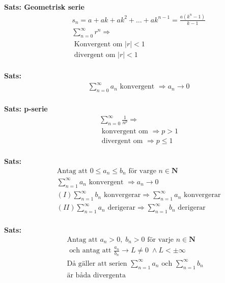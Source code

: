 \begin{multicols}{2}
  \textbf{Sats: Geometrisk serie}
  \begin{align*}
    &\quad  s _ { n } = a + a k + a k ^ { 2 } + \ldots + a k ^ { n - 1 } = \frac { a \left( k ^ { n } - 1 \right) }
    { k - 1 } \\
    &\quad  \displaystyle\sum_{n=0}^{\infty}r^n \Rightarrow \\
    &\quad  \text{ Konvergent om } |r|<1  \\
    &\quad  \text{ divergent om } |r|<1  \\
  \end{align*}

\textbf{Sats: }
\begin{align*}
  &\quad  \displaystyle\sum_{n=0}^{\infty}a_n \text{ konvergent } \Rightarrow a_n\to{0} \\
\end{align*}

\textbf{Sats: p-serie}
\begin{align*}
  &\quad  \displaystyle\sum_{n=0}^{\infty}\frac{1}{n^p} \Rightarrow \\
  &\quad  \text{ konvergent om } \Rightarrow p>1 \\
  &\quad  \text{ divergent om } \Rightarrow p\leq1 \\  
\end{align*}

\textbf{Sats: }
\begin{align*}
  &\quad  \text{Antag att } 0 \leq a_n \leq b_n \text{ för varge } n\in \mathbf{N} \\
  &\quad  \displaystyle\sum_{n=1}^{\infty}a_n \text{ konvergent } \Rightarrow a_n\to{0} \\
  &\quad  (I) \displaystyle\sum_{n=1}^{\infty}b_n \text{ konvergerar}
  \Rightarrow \displaystyle\sum_{n=1}^{\infty}a_n \text{ konvergerar} \\
  &\quad  (II) \displaystyle\sum_{n=1}^{\infty}a_n \text{ derigerar}
  \Rightarrow \displaystyle\sum_{n=1}^{\infty}b_n \text{ derigerar} \\
\end{align*}


\textbf{Sats: }
\begin{align*}
  &\text{Antag att } a_n >0, \; b_n >0 \text{ för varje } n \in \mathbf{N} \\
  &\text{ och antag att } \frac{a_n}{b_n}\to L \neq 0 \; \land L < \pm\infty\\
  &\text{Då gäller att serien } \displaystyle\sum_{n=1}^{\infty}a_n \text{ och }
  \displaystyle\sum_{n=1}^{\infty}b_n \\
  &\text{är båda divergenta} \\
\end{align*}


\end{multicols}

